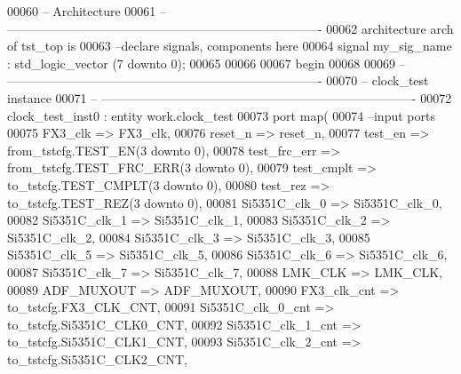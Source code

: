 \begin{DoxyCode}
00060 \textcolor{keyword}{-- Architecture}
00061 \textcolor{keyword}{-- ----------------------------------------------------------------------------}
00062 \textcolor{keywordflow}{architecture} arch \textcolor{keywordflow}{of} tst_top is
00063 \textcolor{keyword}{--declare signals,  components here}
00064 \textcolor{keywordflow}{signal} \textcolor{vhdlchar}{my_sig_name} \textcolor{vhdlchar}{:} \textcolor{comment}{std\_logic\_vector} \textcolor{vhdlchar}{(}\textcolor{vhdllogic}{}\textcolor{vhdllogic}{7} \textcolor{keywordflow}{downto} \textcolor{vhdllogic}{}\textcolor{vhdllogic}{0}\textcolor{vhdlchar}{)}; 
00065 
00066   
00067 \textcolor{vhdlkeyword}{begin}
00068 
00069 \textcolor{keyword}{-- ----------------------------------------------------------------------------}
00070 \textcolor{keyword}{-- clock\_test instance}
00071 \textcolor{keyword}{-- ----------------------------------------------------------------------------}
00072    clock\_test\_inst0 : \textcolor{keywordflow}{entity} work.clock_test
00073    \textcolor{keywordflow}{port} \textcolor{keywordflow}{map}(
00074 \textcolor{keyword}{      --input ports }
00075       FX3_clk           => FX3_clk,
00076       reset_n           => reset_n,
00077       test_en           => from\_tstcfg.TEST\_EN\textcolor{vhdlchar}{(}\textcolor{vhdllogic}{3} \textcolor{keywordflow}{downto} \textcolor{vhdllogic}{0}\textcolor{vhdlchar}{)},
00078       test_frc_err      => from\_tstcfg.TEST\_FRC\_ERR\textcolor{vhdlchar}{(}\textcolor{vhdllogic}{3} \textcolor{keywordflow}{downto} \textcolor{vhdllogic}{0}\textcolor{vhdlchar}{)},
00079       test_cmplt        => to\_tstcfg.TEST\_CMPLT\textcolor{vhdlchar}{(}\textcolor{vhdllogic}{3} \textcolor{keywordflow}{downto} \textcolor{vhdllogic}{0}\textcolor{vhdlchar}{)},
00080       test_rez          => to\_tstcfg.TEST\_REZ\textcolor{vhdlchar}{(}\textcolor{vhdllogic}{3} \textcolor{keywordflow}{downto} \textcolor{vhdllogic}{0}\textcolor{vhdlchar}{)},      
00081       Si5351C_clk_0     => Si5351C_clk_0,
00082       Si5351C_clk_1     => Si5351C_clk_1,
00083       Si5351C_clk_2     => Si5351C_clk_2,
00084       Si5351C_clk_3     => Si5351C_clk_3,
00085       Si5351C_clk_5     => Si5351C_clk_5,
00086       Si5351C_clk_6     => Si5351C_clk_6,
00087       Si5351C_clk_7     => Si5351C_clk_7,
00088       LMK_CLK           => LMK_CLK,
00089       ADF_MUXOUT        => ADF_MUXOUT,      
00090       FX3_clk_cnt       => to\_tstcfg.FX3\_CLK\_CNT,
00091       Si5351C_clk_0_cnt => to\_tstcfg.Si5351C\_CLK0\_CNT,
00092       Si5351C_clk_1_cnt => to\_tstcfg.Si5351C\_CLK1\_CNT,
00093       Si5351C_clk_2_cnt => to\_tstcfg.Si5351C\_CLK2\_CNT,

\end{DoxyCode}
